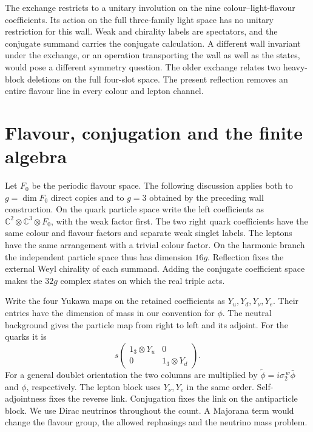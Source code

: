 \documentclass[aps,prd,reprint,onecolumn,nofootinbib,amsmath,amssymb]{revtex4-2}
\begin{document}
The exchange restricts to a unitary involution on the nine colour--light-flavour coefficients. Its action on the full three-family light space has no unitary restriction for this wall. Weak and chirality labels are spectators, and the conjugate summand carries the conjugate calculation. A different wall invariant under the exchange, or an operation transporting the wall as well as the states, would pose a different symmetry question. The older exchange relates two heavy-block deletions on the full four-slot space. The present reflection removes an entire flavour line in every colour and lepton channel.

\section{Flavour, conjugation and the finite algebra}
Let $F_0$ be the periodic flavour space. The following discussion applies both to $g=\dim F_0$ direct copies and to $g=3$ obtained by the preceding wall construction. On the quark particle space write the left coefficients as $\mathbb C^2\otimes\mathbb C^3\otimes F_0$, with the weak factor first. The two right quark coefficients have the same colour and flavour factors and separate weak singlet labels. The leptons have the same arrangement with a trivial colour factor. On the harmonic branch the independent particle space thus has dimension $16g$. Reflection fixes the external Weyl chirality of each summand. Adding the conjugate coefficient space makes the $32g$ complex states on which the real triple acts.

Write the four Yukawa maps on the retained coefficients as $Y_u,Y_d,Y_\nu,Y_e$. Their entries have the dimension of mass in our convention for $\phi$. The neutral background gives the particle map from right to left and its adjoint. For the quarks it is
\begin{equation}
 s\begin{pmatrix}1_3\otimes Y_u&0\\0&1_3\otimes Y_d\end{pmatrix}.
 \label{eq:yuk}
\end{equation}
For a general doublet orientation the two columns are multiplied by $\widetilde\phi=i\sigma_2^{\,w}\bar\phi$ and $\phi$, respectively. The lepton block uses $Y_\nu,Y_e$ in the same order. Self-adjointness fixes the reverse link. Conjugation fixes the link on the antiparticle block. We use Dirac neutrinos throughout the count. A Majorana term would change the flavour group, the allowed rephasings and the neutrino mass problem.
\end{document}
